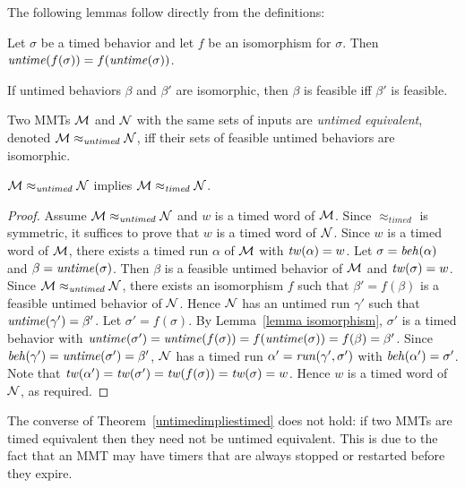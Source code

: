 The following lemmas follow directly from the definitions:
\begin{lemma}
\label{lemma isomorphism}
Let $\sigma$ be a timed behavior and let $f$ be an isomorphism for $\sigma$.
Then $\mathit{untime}(f(\sigma)) = f(\mathit{untime}(\sigma))$.
\end{lemma}
\begin{lemma}
If untimed behaviors $\beta$ and $\beta'$ are isomorphic, then $\beta$ is feasible iff $\beta'$ is feasible.
\end{lemma}

Two MMTs ${\cal M}$ and ${\cal N}$ with the same sets of inputs are \emph{untimed equivalent}, denoted ${\cal M} \approx_{\mathit{untimed}} {\cal N}$, iff their sets of feasible untimed behaviors are isomorphic.


\begin{theorem}
\label{untimedimpliestimed}
${\cal M} \approx_{\mathit{untimed}} {\cal N}$
implies
${\cal M} \approx_{\mathit{timed}} {\cal N}$.
\end{theorem}
\begin{proof}
Assume ${\cal M} \approx_{\mathit{untimed}} {\cal N}$ and $w$ is a timed word of ${\cal M}$.
Since $\approx_{\mathit{timed}}$ is symmetric, it suffices to prove that $w$ is a timed word of ${\cal N}$.
Since $w$ is a timed word of ${\cal M}$,
there exists a timed run $\alpha$ of ${\cal M}$ with $\mathit{tw}(\alpha) = w$. 
Let $\sigma = \mathit{beh}(\alpha)$ and $\beta = \mathit{untime}(\sigma)$. 
Then $\beta$ is a feasible untimed behavior of ${\cal M}$ and $\mathit{tw}(\sigma) = w$.
Since  ${\cal M} \approx_{\mathit{untimed}} {\cal N}$, there exists an isomorphism $f$ such that 
$\beta' = f(\beta)$ is a feasible untimed behavior of ${\cal N}$.
Hence ${\cal N}$ has an untimed run $\gamma'$ such that $\mathit{untime}(\gamma') = \beta'$.
Let $\sigma' = f(\sigma)$.
By Lemma~\ref{lemma isomorphism}, $\sigma'$ is a timed behavior with 
$\mathit{untime}(\sigma') = \mathit{untime}(f(\sigma)) = f(\mathit{untime}(\sigma)) = f(\beta) = \beta'$.
Since $\mathit{beh}(\gamma') = \mathit{untime}(\sigma') = \beta'$, ${\cal N}$ has a timed run $\alpha' = \mathit{run}(\gamma',\sigma')$ with
$\mathit{beh}(\alpha') = \sigma'$.
Note that $\mathit{tw}(\alpha') = \mathit{tw}(\sigma') = \mathit{tw}(f(\sigma)) = \mathit{tw}(\sigma) = w$.
Hence $w$ is a timed word of ${\cal N}$, as required.
\end{proof}

The converse of Theorem~\ref{untimedimpliestimed} does not hold: if two MMTs are timed equivalent then they need not
be untimed equivalent. This is due to the fact that an MMT may have timers that are always stopped or restarted before
they expire.


